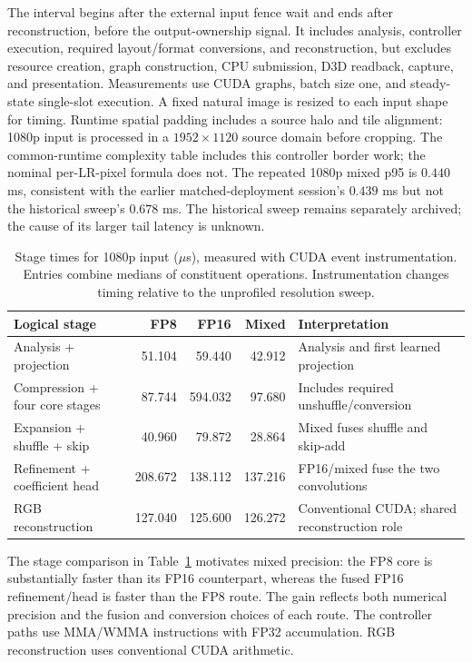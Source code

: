 \documentclass[10pt,twocolumn,letterpaper]{article}
\begin{document}
The interval begins after the external input fence wait and ends after reconstruction, before the output-ownership signal.
It includes analysis, controller execution, required layout/format conversions, and reconstruction, but excludes resource creation, graph construction, CPU submission, D3D readback, capture, and presentation.
Measurements use CUDA graphs, batch size one, and steady-state single-slot execution.
A fixed natural image is resized to each input shape for timing.
Runtime spatial padding includes a source halo and tile alignment: 1080p input is processed in a $1952\times1120$ source domain before cropping.
The common-runtime complexity table includes this controller border work; the nominal per-LR-pixel formula does not.
The repeated 1080p mixed p95 is $0.440$ ms, consistent with the earlier matched-deployment session's $0.439$ ms but not the historical sweep's $0.678$ ms.
The historical sweep remains separately archived; the cause of its larger tail latency is unknown.


\begin{table}[t]
\centering\small
\caption{Stage times for 1080p input ($\mu$s), measured with CUDA event instrumentation. Entries combine medians of constituent operations. Instrumentation changes timing relative to the unprofiled resolution sweep.}
\label{tab:stage-profile}
\begin{tabular}{lrrrl}
\toprule
Logical stage & FP8 & FP16 & Mixed & Interpretation\\
\midrule
Analysis + projection &51.104&59.440&42.912&Analysis and first learned projection\\
Compression + four core stages &87.744&594.032&97.680&Includes required unshuffle/conversion\\
Expansion + shuffle + skip &40.960&79.872&28.864&Mixed fuses shuffle and skip-add\\
Refinement + coefficient head &208.672&138.112&137.216&FP16/mixed fuse the two convolutions\\
RGB reconstruction &127.040&125.600&126.272&Conventional CUDA; shared reconstruction role\\
\bottomrule
\end{tabular}
\end{table}

The stage comparison in Table~\ref{tab:stage-profile} motivates mixed precision: the FP8 core is substantially faster than its FP16 counterpart, whereas the fused FP16 refinement/head is faster than the FP8 route.
The gain reflects both numerical precision and the fusion and conversion choices of each route.
The controller paths use MMA/WMMA instructions with FP32 accumulation.
RGB reconstruction uses conventional CUDA arithmetic.
\end{document}
